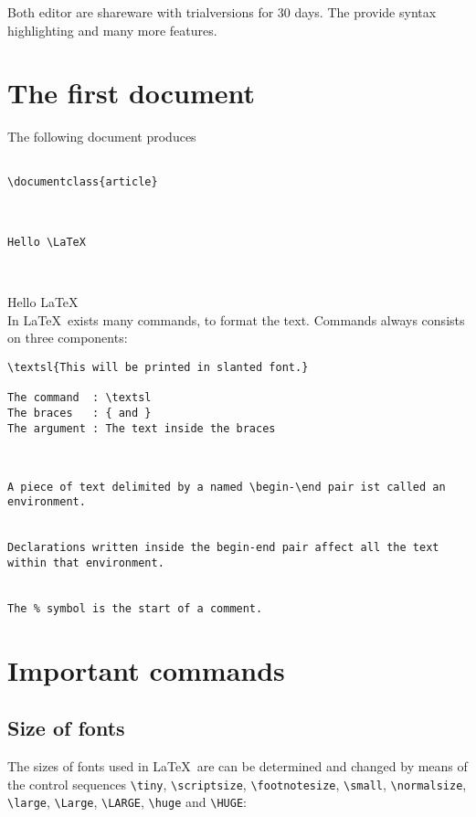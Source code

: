Both editor are shareware with trialversions for 30 days. The provide syntax highlighting and many more features.

\section{The first document}

The following document produces

\begin{verbatim}

\documentclass{article}



Hello \LaTeX



\end{verbatim}

Hello \LaTeX\\



In \LaTeX\ exists many commands, to format the text.
Commands always consists on three components:

\begin{verbatim}
\textsl{This will be printed in slanted font.}

The command  : \textsl
The braces   : { and }
The argument : The text inside the braces
\end{verbatim} 



\begin{verbatim}


A piece of text delimited by a named \begin-\end pair ist called an environment.


Declarations written inside the begin-end pair affect all the text within that environment.


The % symbol is the start of a comment.

\end{verbatim}

\section{Important commands}

\subsection{Size of fonts}
The sizes of fonts used in \LaTeX\ are can be determined
and changed by means of the control sequences
\verb/\tiny/,
\verb/\scriptsize/,
\verb/\footnotesize/,
\verb/\small/,
\verb/\normalsize/,
\verb/\large/,
\verb/\Large/,
\verb/\LARGE/,
\verb/\huge/ and
\verb/\HUGE/:


